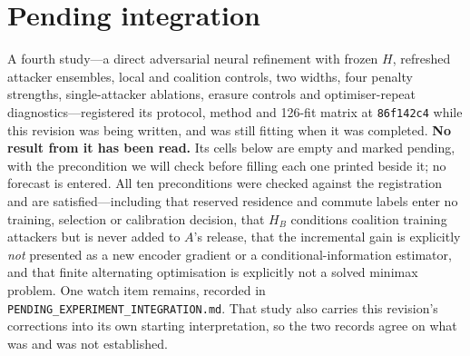 \documentclass[10pt]{article}
\begin{document}
\section{Pending integration}
\label{app:pending}
\noindent A fourth study---a direct adversarial neural refinement with frozen $H$, refreshed
attacker ensembles, local and coalition controls, two widths, four penalty strengths,
single-attacker ablations, erasure controls and optimiser-repeat diagnostics---registered its
protocol, method and 126-fit matrix at \texttt{86f142c4} while this revision was being written, and
was still fitting when it was completed. \textbf{No result from it has been read.} Its cells below
are empty and marked pending, with the precondition we will check before filling each one printed
beside it; no forecast is entered. All ten preconditions were checked against the registration and
are satisfied---including that reserved residence and commute labels enter no training, selection or
calibration decision, that $H_B$ conditions coalition training attackers but is never added to
$A$'s release, that the incremental gain is explicitly \emph{not} presented as a new encoder gradient
or a conditional-information estimator, and that finite alternating optimisation is explicitly not a
solved minimax problem. One watch item remains, recorded in
\texttt{PENDING\_EXPERIMENT\_INTEGRATION.md}. That study also carries this revision's corrections
into its own starting interpretation, so the two records agree on what was and was not established.
\begin{center}\small\end{center}
\noindent\footnotesize\notePendingStudyFour\normalsize


\end{document}
